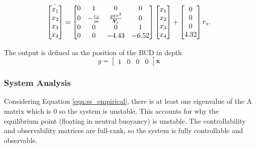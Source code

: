 \documentclass[conference, letterpaper]{IEEEtran}
\DeclareRobustCommand{\volume}{\text{\volumedash}V}
\newcommand{\volumedash}{%
  \makebox[0pt][l]{%
    \ooalign{$V$\cr\raisebox{0.15em}{\kern0.04em--}\cr}%
  }%
}
\begin{document}
\begin{multline}
    \Dot{
        \begin{bmatrix}
            x_1 \\
            x_2 \\
            x_3 \\
            x_4
        \end{bmatrix}
    } =
    \begin{bmatrix}
        0 & 1              & 0                          & 0     \\
        0 & -\frac{c_d}{m} & \frac{g\pi r^2}{\volume_s} & 0     \\
        0 & 0              & 0                          & 1     \\
        0 & 0              & -4.43                      & -6.52
    \end{bmatrix}
    \begin{bmatrix}
        x_1 \\
        x_2 \\
        x_3 \\
        x_4
    \end{bmatrix}
    +
    \begin{bmatrix}
        0 \\
        0 \\
        0 \\
        4.32
    \end{bmatrix} r_z.
    \label{eqn:ss_empirical}
\end{multline}

The output is defined as the position of the BCD in depth
\begin{equation}
    y =
    \begin{bmatrix}
        1 & 0 & 0 & 0
    \end{bmatrix} \mathbf{x}
\end{equation}

\subsubsection*{System Analysis}
Considering Equation \ref{eqn:ss_empirical}, there is at least one eigenvalue of the A matrix which is $0$ so the system is unstable. This accounts for why the equilibrium point (floating in neutral buoyancy) is unstable. The controllability and observability matrices are full-rank, so the system is fully controllable and observable.
\end{document}
